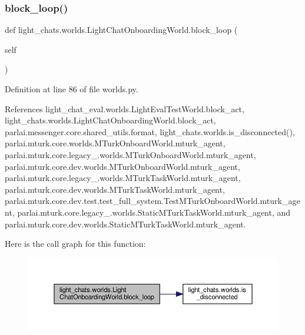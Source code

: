 \subsubsection{\texorpdfstring{block\+\_\+loop()}{block\_loop()}}
{\footnotesize\ttfamily def light\+\_\+chats.\+worlds.\+Light\+Chat\+Onboarding\+World.\+block\+\_\+loop (\begin{DoxyParamCaption}\item[{}]{self }\end{DoxyParamCaption})}



Definition at line 86 of file worlds.\+py.



References light\+\_\+chat\+\_\+eval.\+worlds.\+Light\+Eval\+Test\+World.\+block\+\_\+act, light\+\_\+chats.\+worlds.\+Light\+Chat\+Onboarding\+World.\+block\+\_\+act, parlai.\+messenger.\+core.\+shared\+\_\+utils.\+format, light\+\_\+chats.\+worlds.\+is\+\_\+disconnected(), parlai.\+mturk.\+core.\+worlds.\+M\+Turk\+Onboard\+World.\+mturk\+\_\+agent, parlai.\+mturk.\+core.\+legacy\+\_.\+worlds.\+M\+Turk\+Onboard\+World.\+mturk\+\_\+agent, parlai.\+mturk.\+core.\+dev.\+worlds.\+M\+Turk\+Onboard\+World.\+mturk\+\_\+agent, parlai.\+mturk.\+core.\+legacy\+\_.\+worlds.\+M\+Turk\+Task\+World.\+mturk\+\_\+agent, parlai.\+mturk.\+core.\+dev.\+worlds.\+M\+Turk\+Task\+World.\+mturk\+\_\+agent, parlai.\+mturk.\+core.\+dev.\+test.\+test\+\_\+full\+\_\+system.\+Test\+M\+Turk\+Onboard\+World.\+mturk\+\_\+agent, parlai.\+mturk.\+core.\+legacy\+\_.\+worlds.\+Static\+M\+Turk\+Task\+World.\+mturk\+\_\+agent, and parlai.\+mturk.\+core.\+dev.\+worlds.\+Static\+M\+Turk\+Task\+World.\+mturk\+\_\+agent.

Here is the call graph for this function\+:
\nopagebreak
\begin{figure}[H]
\begin{center}
\leavevmode
\includegraphics[width=350pt]{classlight__chats_1_1worlds_1_1LightChatOnboardingWorld_a0f913f08e74b21ad1d6b04c302e38850_cgraph}
\end{center}
\end{figure}
\mbox{\label{classlight__chats_1_1worlds_1_1LightChatOnboardingWorld_ade47ed749c72e46f2f692a96aaede09a}} 
